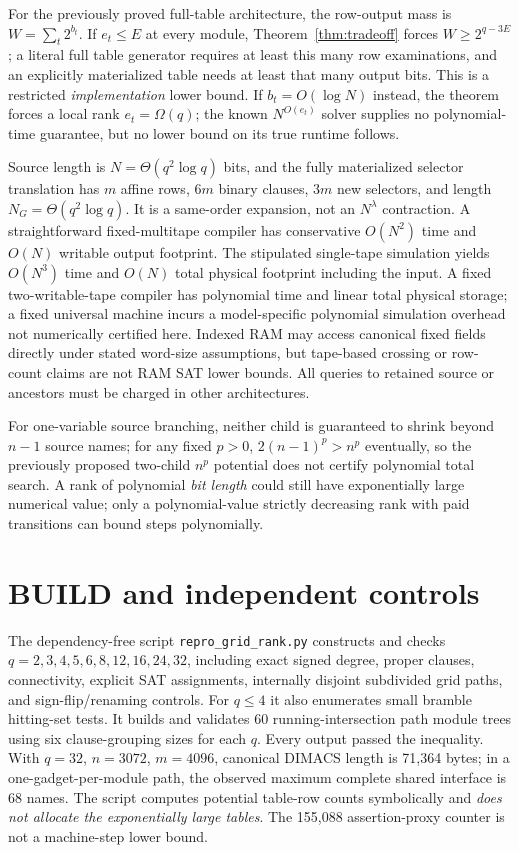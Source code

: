 \documentclass[11pt]{article}
\begin{document}
For the previously proved full-table architecture, the row-output mass is $W=\sum_t2^{b_t}$. If $e_t\le E$ at every module, Theorem~\ref{thm:tradeoff} forces $W\ge2^{q-3E}$; a literal full table generator requires at least this many row examinations, and an explicitly materialized table needs at least that many output bits. This is a restricted \emph{implementation} lower bound. If $b_t=O(\log N)$ instead, the theorem forces a local rank $e_t=\Omega(q)$; the known $N^{O(e_t)}$ solver supplies no polynomial-time guarantee, but no lower bound on its true runtime follows.

Source length is $N=\Theta(q^2\log q)$ bits, and the fully materialized selector translation has $m$ affine rows, $6m$ binary clauses, $3m$ new selectors, and length $N_G=\Theta(q^2\log q)$. It is a same-order expansion, not an $N^\lambda$ contraction. A straightforward fixed-multitape compiler has conservative $O(N^2)$ time and $O(N)$ writable output footprint. The stipulated single-tape simulation yields $O(N^3)$ time and $O(N)$ total physical footprint including the input. A fixed two-writable-tape compiler has polynomial time and linear total physical storage; a fixed universal machine incurs a model-specific polynomial simulation overhead not numerically certified here. Indexed RAM may access canonical fixed fields directly under stated word-size assumptions, but tape-based crossing or row-count claims are not RAM SAT lower bounds. All queries to retained source or ancestors must be charged in other architectures.

For one-variable source branching, neither child is guaranteed to shrink beyond $n-1$ source names; for any fixed $p>0$, $2(n-1)^p>n^p$ eventually, so the previously proposed two-child $n^p$ potential does not certify polynomial total search. A rank of polynomial \emph{bit length} could still have exponentially large numerical value; only a polynomial-value strictly decreasing rank with paid transitions can bound steps polynomially.

\section{BUILD and independent controls}
The dependency-free script \texttt{repro\_grid\_rank.py} constructs and checks $q=2,3,4,5,6,8,12,16,24,32$, including exact signed degree, proper clauses, connectivity, explicit SAT assignments, internally disjoint subdivided grid paths, and sign-flip/renaming controls. For $q\le4$ it also enumerates small bramble hitting-set tests. It builds and validates 60 running-intersection path module trees using six clause-grouping sizes for each $q$. Every output passed the inequality. With $q=32$, $n=3072$, $m=4096$, canonical DIMACS length is 71,364 bytes; in a one-gadget-per-module path, the observed maximum complete shared interface is 68 names. The script computes potential table-row counts symbolically and \emph{does not allocate the exponentially large tables}. The 155,088 assertion-proxy counter is not a machine-step lower bound.
\end{document}
